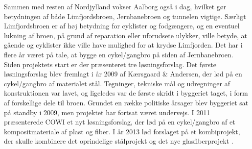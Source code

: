 \newline \indent{     }  Sammen med resten af Nordjylland vokser Aalborg også i dag, hvilket gør betydningen af både Limfjordsbroen, Jernbanebroen og tunnelen vigtige. Særligt Limfjordsbroen er af høj betydning for cyklister og fodgængere, og en eventuel lukning af broen, på grund af reparation eller uforudsete ulykker, ville betyde, at gående og cyklister ikke ville have mulighed for at krydse Limfjorden.
\newline \indent{     }  Det har i flere år været på tale, at bygge en cykel/gangbro på siden af Jernbanebroen. Siden projektets start er der præsenteret tre løsningsforslag. Det første løsningsforslag blev fremlagt i år 2009 af Kærsgaard \& Andersen, der lød på en cykel/gangbro af materialet stål. Tegninger, tekniske mål og udregninger af konstruktionen var lavet, og ligeledes var de første skridt i byggeriet taget, i form af forskellige dele til broen. Grundet en række politiske årsager blev byggeriet sat på standby i 2009, men projektet har fortsat været undervejs. I 2011 præsenterede COWI et nyt løsningsforslag, der lød på en cykel/gangbro af et kompositmateriale af plast og fiber. I år 2013 lød forslaget på et kombiprojekt, der skulle kombinere det oprindelige stålprojekt og det nye glasfiberprojekt \citep{KulturbroAalborg}. 